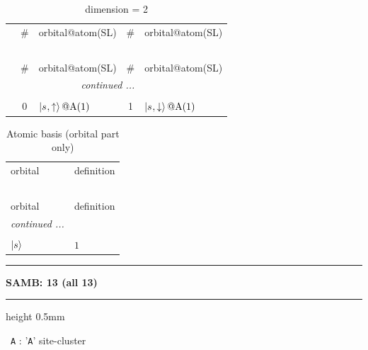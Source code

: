 \documentclass[fleqn,10pt,landscape]{jsarticle}
\begin{document}
\renewcommand{\arraystretch}{1.6}
\begin{longtable}[l]{c|cl|cl}
\captionsetup{justification=raggedright, singlelinecheck=off}
\caption{dimension = 2}
 \\
 \hline \hline
 & \# & orbital@atom(SL) & \# & orbital@atom(SL) \\ \hline \endfirsthead

\multicolumn{4}{l}{\tablename\ \thetable{}} \\
 \hline \hline
 & \# & orbital@atom(SL) & \# & orbital@atom(SL) \\ \hline \endhead

 \hline \hline
\multicolumn{4}{r}{\footnotesize\it continued ...} \\ \endfoot

 \hline \hline
\multicolumn{4}{r}{} \\ \endlastfoot

 & 0 & $\ket{s_{},\uparrow}@{\rm A}(1)$ & 1 & $\ket{s_{},\downarrow}@{\rm A}(1)$ \\
\end{longtable}
\renewcommand{\arraystretch}{1.6}
\begin{longtable}[l]{ll}
\captionsetup{justification=raggedright, singlelinecheck=off}
\caption{Atomic basis (orbital part only)}
 \\
 \hline \hline
orbital & definition \\ \hline \endfirsthead

\multicolumn{1}{l}{\tablename\ \thetable{}} \\
 \hline \hline
orbital & definition \\ \hline \endhead

 \hline \hline
\multicolumn{1}{r}{\footnotesize\it continued ...} \\ \endfoot

 \hline \hline
\multicolumn{1}{r}{} \\ \endlastfoot

$ \ket{s} $ & $ 1 $ \\
\end{longtable}
\vspace{5mm}
\noindent \rule[0.5mm]{5mm}{0.5mm}\hspace{3mm}\textbf{SAMB: 13 (all 13)}\hspace{3mm}\leaders\hrule height 0.5mm\hfill\kern0pt
\vspace{3mm}

\vspace{5mm}

\noindent\textbullet\, \texttt{A} : '\texttt{A}' site-cluster
\end{document}
